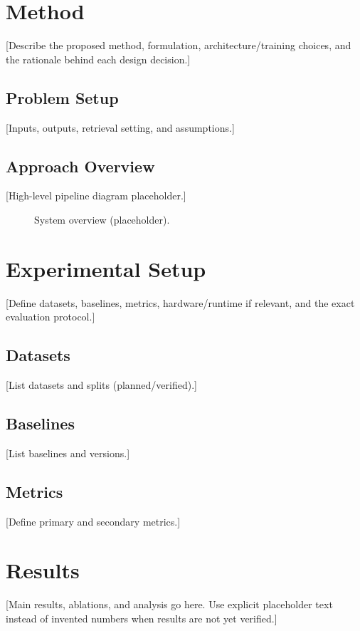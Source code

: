 \documentclass[conference]{IEEEtran}
\begin{document}
\section{Method}
[Describe the proposed method, formulation, architecture/training choices, and
the rationale behind each design decision.]

\subsection{Problem Setup}
[Inputs, outputs, retrieval setting, and assumptions.]

\subsection{Approach Overview}
[High-level pipeline diagram placeholder.]

\begin{figure}[t]
\centering
{}
\caption{System overview (placeholder).}
\label{fig:pipeline}
\end{figure}

\section{Experimental Setup}
[Define datasets, baselines, metrics, hardware/runtime if relevant, and the exact
evaluation protocol.]

\subsection{Datasets}
[List datasets and splits (planned/verified).]

\subsection{Baselines}
[List baselines and versions.]

\subsection{Metrics}
[Define primary and secondary metrics.]

\section{Results}
[Main results, ablations, and analysis go here. Use explicit placeholder text
instead of invented numbers when results are not yet verified.]
\end{document}
